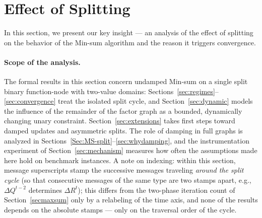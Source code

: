 \documentclass[letterpaper]{article} %
\theoremstyle{definition}
\theoremstyle{remark}
\begin{document}
\section{Effect of Splitting}\label{sec:setting}
In this section, we present our key insight --- an analysis of the effect of splitting on the behavior of the Min-sum algorithm and the reason it triggers convergence.

\paragraph{Scope of the analysis.}
The formal results in this section concern undamped Min-sum on a single split binary function-node with two-value domains: Sections~\ref{sec:regimes}--\ref{sec:convergence} treat the isolated split cycle, and Section~\ref{sec:dynamic} models the influence of the remainder of the factor graph as a bounded, dynamically changing unary constraint. Section~\ref{sec:extensions} takes first steps toward damped updates and asymmetric splits. The role of damping in full graphs is analyzed in Sections~\ref{Sec:MS-split}--\ref{sec:whydamping}, and the instrumentation experiment of Section~\ref{sec:mechanism} measures how often the assumptions made here hold on benchmark instances.
A note on indexing: within this section, message superscripts stamp the successive messages traveling \emph{around the split cycle} (so that consecutive messages of the same type are two stamps apart, e.g., $\Delta Q^{t-2}$ determines $\Delta R^{t}$); this differs from the two-phase iteration count of Section~\ref{secmaxsum} only by a relabeling of the time axis, and none of the results depends on the absolute stamps --- only on the traversal order of the cycle.
\end{document}

